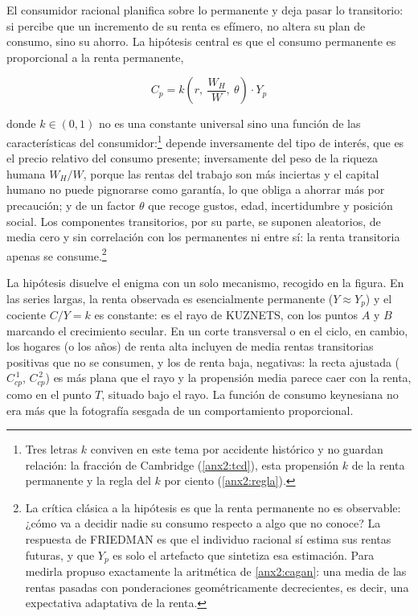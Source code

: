 \documentclass[10pt,a4paper]{article}
\begin{document}
El consumidor racional planifica sobre lo permanente y deja pasar lo transitorio: si percibe que un incremento de su renta es efímero, no altera su plan de consumo, sino su ahorro. La hipótesis central es que el consumo permanente es proporcional a la renta permanente,

$$C_p=k\!\left(r,\ \frac{W_H}{W},\ \theta\right)\cdot Y_p$$

donde $k\in(0,1)$ no es una constante universal sino una función de las características del consumidor:\footnote{%
    Tres letras $k$ conviven en este tema por accidente histórico y no guardan relación: la fracción de Cambridge (\ref{anx2:tcd}), esta propensión $k$ de la renta permanente y la regla del $k$ por ciento (\ref{anx2:regla}).
} depende inversamente del tipo de interés, que es el precio relativo del consumo presente; inversamente del peso de la riqueza humana $W_H/W$, porque las rentas del trabajo son más inciertas y el capital humano no puede pignorarse como garantía, lo que obliga a ahorrar más por precaución; y de un factor $\theta$ que recoge gustos, edad, incertidumbre y posición social. Los componentes transitorios, por su parte, se suponen aleatorios, de media cero y sin correlación con los permanentes ni entre sí: la renta transitoria apenas se consume.\footnote{%
    La crítica clásica a la hipótesis es que la renta permanente no es observable: ¿cómo va a decidir nadie su consumo respecto a algo que no conoce? La respuesta de FRIEDMAN es que el individuo racional sí estima sus rentas futuras, y que $Y_p$ es solo el artefacto que sintetiza esa estimación. Para medirla propuso exactamente la aritmética de \ref{anx2:cagan}: una media de las rentas pasadas con ponderaciones geométricamente decrecientes, es decir, una expectativa adaptativa de la renta.
}

La hipótesis disuelve el enigma con un solo mecanismo, recogido en la figura. En las series largas, la renta observada es esencialmente permanente ($Y\approx Y_p$) y el cociente $C/Y=k$ es constante: es el rayo de KUZNETS, con los puntos $A$ y $B$ marcando el crecimiento secular. En un corte transversal o en el ciclo, en cambio, los hogares (o los años) de renta alta incluyen de media rentas transitorias positivas que no se consumen, y los de renta baja, negativas: la recta ajustada ($C^{\,1}_{cp}$, $C^{\,2}_{cp}$) es más plana que el rayo y la propensión media parece caer con la renta, como en el punto $T$, situado bajo el rayo. La función de consumo keynesiana no era más que la fotografía sesgada de un comportamiento proporcional.
\end{document}
